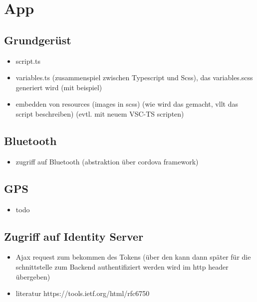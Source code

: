 \section{App}

\subsection{Grundgerüst}
\label{sec:appGrundgerust}

\begin{itemize}
\item script.ts
\item variables.ts (zusammenspiel zwischen Typescript und Scss), das variables.scss generiert wird (mit beispiel)
\item embedden von resources (images in scss) (wie wird das gemacht, vllt das script beschreiben)
(evtl. mit neuem VSC-TS scripten) 
\end{itemize}

\subsection{Bluetooth}
\label{sec:appBluetooth}

\begin{itemize}
\item zugriff auf Bluetooth (abstraktion über cordova framework)
\end{itemize}

\subsection{GPS}
\label{sec:appGPS}

\begin{itemize}
\item todo
\end{itemize}

\subsection{Zugriff auf Identity Server}

\begin{itemize}
\item Ajax request zum bekommen des Tokens (über den kann dann später für die schnittstelle zum Backend authentifiziert werden wird im http header übergeben)
\item literatur https://tools.ietf.org/html/rfc6750
\end{itemize}

